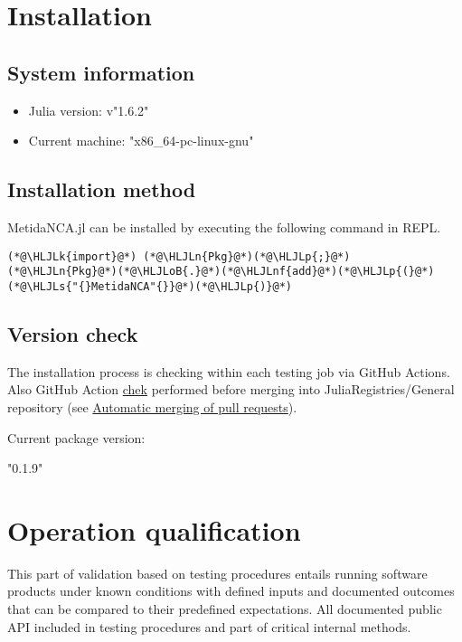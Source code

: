 \documentclass[12pt,a4paper]{article}
\newcommand{\HLJLk}[1]{\textcolor[RGB]{148,91,176}{\textbf{#1}}}
\newcommand{\HLJLn}[1]{#1}
\newcommand{\HLJLnf}[1]{\textcolor[RGB]{66,102,213}{#1}}
\newcommand{\HLJLs}[1]{\textcolor[RGB]{201,61,57}{#1}}
\newcommand{\HLJLoB}[1]{\textcolor[RGB]{102,102,102}{\textbf{#1}}}
\newcommand{\HLJLp}[1]{#1}
\begin{document}
\section{Installation}
\subsection{System information}
\begin{itemize}
\item Julia version: v"1.6.2"


\item Current machine: "x86\_64-pc-linux-gnu"

\end{itemize}
\subsection{Installation method}
MetidaNCA.jl can be installed by executing the following command in REPL.


\begin{lstlisting}
(*@\HLJLk{import}@*) (*@\HLJLn{Pkg}@*)(*@\HLJLp{;}@*) (*@\HLJLn{Pkg}@*)(*@\HLJLoB{.}@*)(*@\HLJLnf{add}@*)(*@\HLJLp{(}@*)(*@\HLJLs{"{}MetidaNCA"{}}@*)(*@\HLJLp{)}@*)
\end{lstlisting}

\subsection{Version check}
The installation process is checking within each testing job via GitHub Actions. Also GitHub Action \href{https://github.com/JuliaRegistries/General/blob/master/.github/workflows/automerge.yml}{chek} performed before merging into JuliaRegistries/General repository (see \href{https://github.com/JuliaRegistries/General#automatic-merging-of-pull-requests}{Automatic merging of pull requests}).



Current package version:


"0.1.9"


\section{Operation qualification}
This part of validation based on testing procedures entails running software products under known conditions with defined inputs and documented outcomes that can be compared to their predefined expectations. All documented public API included in testing procedures and part of critical internal methods.
\end{document}
